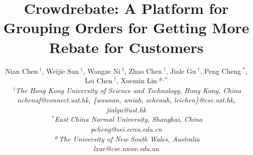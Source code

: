 \documentclass[conference]{IEEEtran}
\title{Crowdrebate: A Platform for Grouping Orders for Getting More Rebate for Customers}
\author{
	{Nian Chen{\small $~^{\dagger}$}, Weijie Sun{\small $~^{\dagger}$}, Wangze Ni{\small $~^{\dagger}$}, Zhao Chen{\small $~^{\dagger}$}, Jiale Gu{\small $~^{\dagger}$}, Peng Cheng{\small $~^{*}$}, Lei Chen{\small $~^{\dagger}$}, Xuemin Lin{\small $~^{\#,*}$}
	} \\
	\fontsize{10}{10}\selectfont\itshape
	$~^{\dagger}$The Hong Kong University of Science and Technology, Hong Kong, China\\
	\fontsize{9}{9}\selectfont\ttfamily\upshape
	nchenaf@connect.ust.hk, \{wsunan, wniab, zchenah, leichen\}@cse.ust.hk, jialgu@ust.hk\\
	\fontsize{10}{10}\selectfont\itshape
	$~^{*}$East China Normal University, Shanghai, China\\
	\fontsize{9}{9}\selectfont\ttfamily\upshape pcheng@sei.ecnu.edu.cn \\
	\fontsize{10}{10}\selectfont\itshape
	$~^{\#}$The University of New South Wales, Australia\\
	\fontsize{9}{9}\selectfont\ttfamily\upshape
	lxue@cse.unsw.edu.au\\
}
\begin{document}
\maketitle





%



\balance




\bgroup\small

\let\xxx=\bibitem\def\bibitem{\par\vspace{0mm}\xxx} %

\egroup

\nobalance
\newpage
\end{document}
